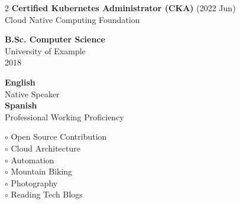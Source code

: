 \documentclass{awesome-cv}
\begin{document}
\begin{paracol}{2}
\textbf{\color{black}Certified Kubernetes Administrator (CKA)} {\small\color{accent}(2022 Jun)}\\
{\small\color{text}Cloud Native Computing Foundation}\\[0.2em]



\vspace{0.2em}


\textbf{\color{black}B.Sc. Computer Science}\\
{\small\color{text}University of Example}\\
{\small\color{accent}2018}\\[0.2em]



\vspace{0.2em}


\textbf{\color{black}English}\\
{\small\color{text}Native Speaker}\\[0.2em]

\textbf{\color{black}Spanish}\\
{\small\color{text}Professional Working Proficiency}\\[0.2em]




\vspace{0.2em}

{\linespread{0.7}\selectfont
$\circ$ \color{text}Open Source Contribution\\[-0.005em]
$\circ$ \color{text}Cloud Architecture\\[-0.005em]
$\circ$ \color{text}Automation\\[-0.005em]
$\circ$ \color{text}Mountain Biking\\[-0.005em]
$\circ$ \color{text}Photography\\[-0.005em]
$\circ$ \color{text}Reading Tech Blogs\\[-0.005em]}



\switchcolumn[1]


\end{paracol}
\end{document}
